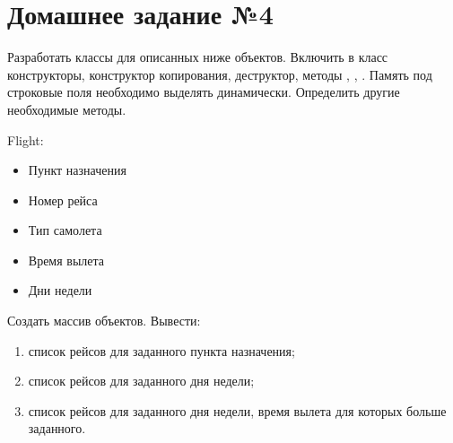\section*{Домашнее задание №4}

Разработать классы для описанных ниже объектов. Включить в класс
конструкторы, конструктор копирования, деструктор, методы ,
, . Память под строковые поля необходимо выделять
динамически. Определить другие необходимые методы.

Flight:
\begin{itemize}
	\item Пункт назначения
	\item Номер рейса
	\item Тип самолета
	\item Время вылета
	\item Дни недели
\end{itemize}

Создать массив объектов. Вывести:
\begin{enumerate}
	\item список рейсов для заданного пункта назначения;
	\item список рейсов для заданного дня недели;
	\item список рейсов для заданного дня недели, время вылета для которых
		больше заданного.
\end{enumerate}
